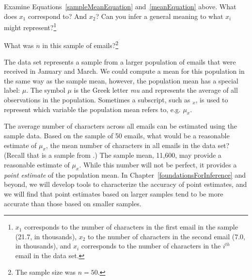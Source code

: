 \begin{exercise}
Examine Equations~\eqref{sampleMeanEquation} and~\eqref{meanEquation} above. What does $x_1$ correspond to? And $x_2$? Can you infer a general meaning to what $x_i$ might represent?\footnote{$x_1$ corresponds to the number of characters in the first email in the sample (21.7, in thousands), $x_2$ to the number of characters in the second email (7.0, in thousands), and $x_i$ corresponds to the number of characters in the $i^{th}$ email in the data set.}
\end{exercise}

\begin{exercise}
What was $n$ in this sample of emails?\footnote{The sample size was $n=50$.}
\end{exercise}

The  data set represents a sample from a larger population of emails that were received in January and March. We could compute a mean for this population in the same way as the sample mean, however, the population mean has a special label: $\mu$.  The symbol $\mu$ is the Greek letter \emph{mu} and represents the average of all observations in the population. Sometimes a subscript, such as $_x$, is used to represent which variable the population mean refers to, e.g. $\mu_x$.

\begin{example}{The average number of characters across all emails can be estimated using the sample data. Based on the sample of 50 emails, what would be a reasonable estimate of $\mu_x$, the mean number of characters in all emails in the  data set? (Recall that  is a sample from .)}
The sample mean, 11,600, may provide a reasonable estimate of $\mu_x$. While this number will not be perfect, it provides a \emph{point estimate} of the population mean. In Chapter~\ref{foundationsForInference} and beyond, we will develop tools to characterize the accuracy of point estimates, and we will find that point estimates based on larger samples tend to be more accurate than those based on smaller samples.
\end{example}

